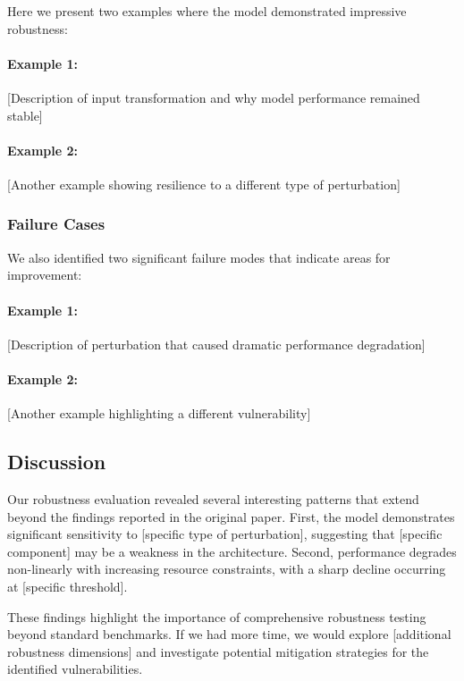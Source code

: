 \documentclass[11pt,a4paper]{article}
\begin{document}
Here we present two examples where the model demonstrated impressive robustness:

\paragraph{Example 1:} [Description of input transformation and why model performance remained stable]

\paragraph{Example 2:} [Another example showing resilience to a different type of perturbation]

\subsubsection{Failure Cases}

We also identified two significant failure modes that indicate areas for improvement:

\paragraph{Example 1:} [Description of perturbation that caused dramatic performance degradation]

\paragraph{Example 2:} [Another example highlighting a different vulnerability]

\subsection{Discussion}

Our robustness evaluation revealed several interesting patterns that extend beyond the findings reported in the original paper. First, the model demonstrates significant sensitivity to [specific type of perturbation], suggesting that [specific component] may be a weakness in the architecture. Second, performance degrades non-linearly with increasing resource constraints, with a sharp decline occurring at [specific threshold].

These findings highlight the importance of comprehensive robustness testing beyond standard benchmarks. If we had more time, we would explore [additional robustness dimensions] and investigate potential mitigation strategies for the identified vulnerabilities.
\end{document}
